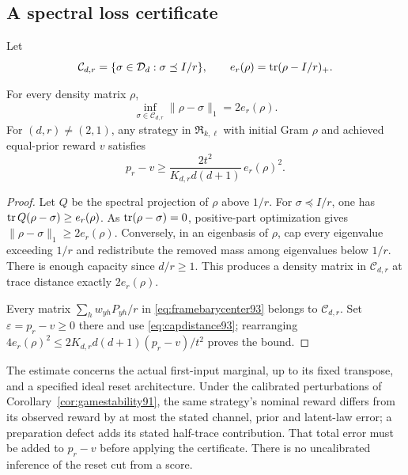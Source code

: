 \subsection{A spectral loss certificate}
Let
\[
 \mathcal C_{d,r}=\{\sigma\in\mathcal D_d:\sigma\preceq I/r\},
 \qquad e_r(\rho)=\operatorname{tr}(\rho-I/r)_+.
\]
\begin{proposition}
\label{prop:spectralloss93}
For every density matrix $\rho$,
\begin{equation}\label{eq:capdistance93}
 \inf_{\sigma\in\mathcal C_{d,r}}\|\rho-\sigma\|_1=2e_r(\rho).
\end{equation}
For $(d,r)\ne(2,1)$, any strategy in $\mathfrak R_{k,\ell}$
with initial Gram $\rho$ and achieved equal-prior reward $v$ satisfies
\begin{equation}\label{eq:spectralloss93}
 p_r-v\ge \frac{2t^2}{K_{d,r}d(d+1)}\,e_r(\rho)^2.
\end{equation}
\end{proposition}
\begin{proof}
Let $Q$ be the spectral projection of $\rho$ above $1/r$.
For $\sigma\preceq I/r$, one has
$\operatorname{tr} Q(\rho-\sigma)\ge e_r(\rho)$.
As $\operatorname{tr}(\rho-\sigma)=0$, positive-part optimization gives
$\|\rho-\sigma\|_1\ge2e_r(\rho)$.
Conversely, in an eigenbasis of $\rho$, cap every eigenvalue exceeding
$1/r$ and redistribute the removed mass among eigenvalues below $1/r$.
There is enough capacity since $d/r\ge1$.  This produces a density
matrix in $\mathcal C_{d,r}$ at trace distance exactly $2e_r(\rho)$.

Every matrix $\sum_hw_{yh}P_{yh}/r$ in
\eqref{eq:framebarycenter93} belongs to $\mathcal C_{d,r}$.
Set $\varepsilon=p_r-v\ge0$ there and use
\eqref{eq:capdistance93}; rearranging $4e_r(\rho)^2\le
2K_{d,r}d(d+1)(p_r-v)/t^2$ proves the bound.
\end{proof}
The estimate concerns the actual first-input marginal, up to its fixed
transpose, and a specified ideal reset architecture.  Under the
calibrated perturbations of Corollary~\ref{cor:gamestability91}, the
same strategy's nominal reward differs from its observed reward by at
most the stated channel, prior and latent-law error; a preparation
defect adds its stated half-trace contribution.  That total error
must be added to $p_r-v$ before applying the certificate.  There is no
uncalibrated inference of the reset cut from a score.

